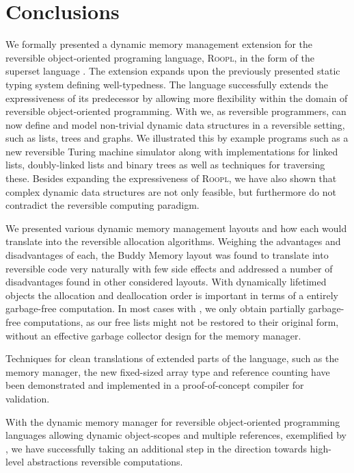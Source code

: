 \chapter{Conclusions}
\label{chp:conclusions}
We formally presented a dynamic memory management extension for the reversible object-oriented programing language, \textsc{Roopl}, in the form of the superset language \rooplpp. The extension expands upon the previously presented static typing system defining well-typedness. The language successfully extends the expressiveness of its predecessor by allowing more flexibility within the domain of reversible object-oriented programming. With \rooplpp we, as reversible programmers, can now define and model non-trivial dynamic data structures in a reversible setting, such as lists, trees and graphs. We illustrated this by example programs such as a new reversible Turing machine simulator along with implementations for linked lists, doubly-linked lists and binary trees as well as techniques for traversing these. Besides expanding the expressiveness of \textsc{Roopl}, we have also shown that complex dynamic data structures are not only feasible, but furthermore do not contradict the reversible computing paradigm.

We presented various dynamic memory management layouts and how each would translate into the reversible allocation algorithms. Weighing the advantages and disadvantages of each, the Buddy Memory layout was found to translate into reversible code very naturally with few side effects and addressed a number of disadvantages found in other considered layouts. With dynamically lifetimed objects the allocation and deallocation order is important in terms of a entirely garbage-free computation. In most cases with \rooplpp, we only obtain partially garbage-free computations, as our free lists might not be restored to their original form, without an effective garbage collector design for the memory manager.

Techniques for clean translations of extended parts of the language, such as the memory manager, the new fixed-sized array type and reference counting have been demonstrated and implemented in a proof-of-concept compiler for validation.

With the dynamic memory manager for reversible object-oriented programming languages allowing dynamic object-scopes and multiple references, exemplified by \rooplpp, we have successfully taking an additional step in the direction towards high-level abstractions reversible computations.  

